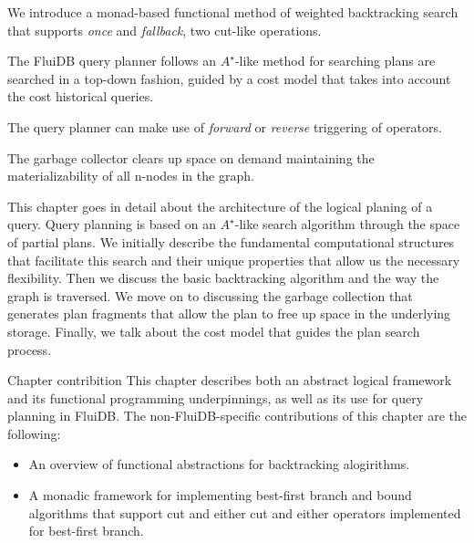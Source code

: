 
\begin{summary}
\item We introduce a monad-based functional method of weighted
  backtracking search that supports \emph{once} and \emph{fallback},
  two cut-like operations.
\item The FluiDB query planner follows an \(A^{\star}\)-like method for
  searching plans are searched in a top-down fashion, guided by a
  cost model that takes into account the cost historical queries.
\item The query planner can make use of \emph{forward} or
  \emph{reverse} triggering of operators.
\item The garbage collector clears up space on demand maintaining the
  materializability of all n-nodes in the graph.
\end{summary}

This chapter goes in detail about the architecture of the logical
planing of a query. Query planning is based on an \(A^{\star}\)-like
search algorithm through the space of partial plans. We initially
describe the fundamental computational structures that facilitate this
search and their unique properties that allow us the necessary
flexibility. Then we discuss the basic backtracking algorithm and the
way the graph is traversed. We move on to discussing the garbage
collection that generates plan fragments that allow the plan to free
up space in the underlying storage. Finally, we talk about the cost
model that guides the plan search process.

\begin{corrected}{Chapter contribition}
  This chapter describes both an abstract logical framework and its
  functional programming underpinnings, as well as its use for query
  planning in FluiDB. The non-FluiDB-specific contributions of this
  chapter are the following:

  \begin{itemize}
  \item An overview of functional abstractions for backtracking
    alogirithms.
  \item A monadic framework for implementing best-first branch and
    bound algorithms that support cut and either cut and either
    operators implemented for best-first branch.
  \end{itemize}
\end{corrected}

